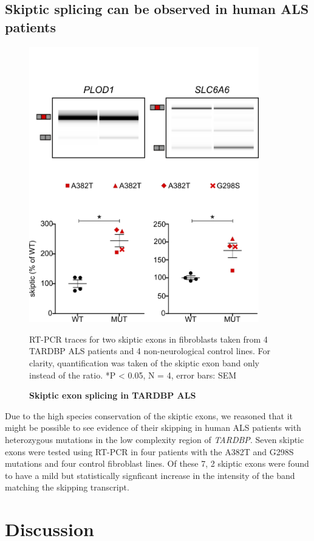\subsection{Skiptic splicing can be observed in human ALS patients}
\begin{figure}[h!]
	\centering
	\includegraphics[width=10cm]{Figures/05_tdp_mice/skiptic_patients.png}
	\caption{\textbf{Skiptic exon splicing in TARDBP ALS}}
		RT-PCR traces for two skiptic exons in fibroblasts taken from 4 TARDBP ALS patients and 4 non-neurological control lines. For clarity, quantification was taken of the skiptic exon band only instead of the ratio. *P < 0.05, N = 4, error bars: SEM
	\label{fig:skiptic_patients}
\end{figure}

Due to the high species conservation of the skiptic exons, we reasoned that it might be possible to see evidence of their skipping in human ALS patients with heterozygous mutations in the low complexity region of \textit{TARDBP}. Seven skiptic exons were tested using RT-PCR in four patients with the A382T and G298S mutations and four control fibroblast lines. 
Of these 7, 2 skiptic exons were found to have a mild but statistically signficant increase in the intensity of the band matching the skipping transcript.	

\clearpage

\section{Discussion}

